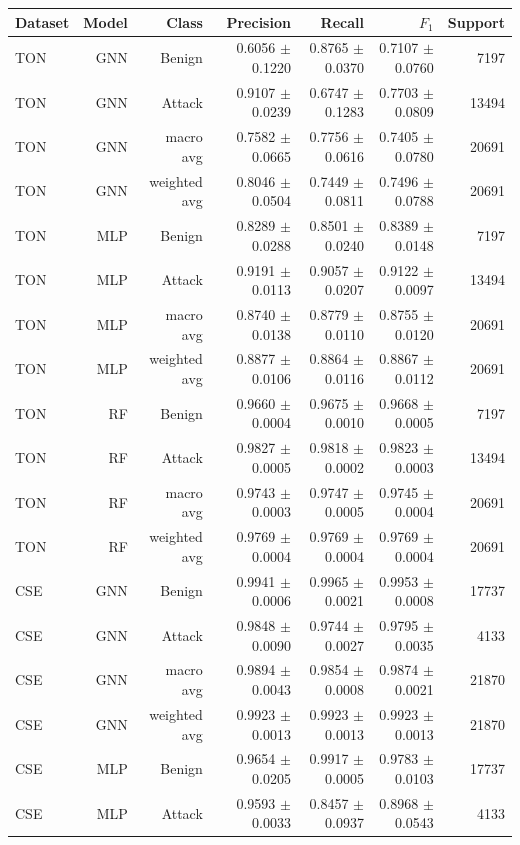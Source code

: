 \begin{tabular}{lrrrrrr}
\toprule
Dataset & Model & Class & Precision & Recall & $F_1$ & Support \\
\midrule
TON & GNN & Benign & 0.6056 $\pm$ 0.1220 & 0.8765 $\pm$ 0.0370 & 0.7107 $\pm$ 0.0760 & 7197 \\
TON & GNN & Attack & 0.9107 $\pm$ 0.0239 & 0.6747 $\pm$ 0.1283 & 0.7703 $\pm$ 0.0809 & 13494 \\
TON & GNN & macro avg & 0.7582 $\pm$ 0.0665 & 0.7756 $\pm$ 0.0616 & 0.7405 $\pm$ 0.0780 & 20691 \\
TON & GNN & weighted avg & 0.8046 $\pm$ 0.0504 & 0.7449 $\pm$ 0.0811 & 0.7496 $\pm$ 0.0788 & 20691 \\
TON & MLP & Benign & 0.8289 $\pm$ 0.0288 & 0.8501 $\pm$ 0.0240 & 0.8389 $\pm$ 0.0148 & 7197 \\
TON & MLP & Attack & 0.9191 $\pm$ 0.0113 & 0.9057 $\pm$ 0.0207 & 0.9122 $\pm$ 0.0097 & 13494 \\
TON & MLP & macro avg & 0.8740 $\pm$ 0.0138 & 0.8779 $\pm$ 0.0110 & 0.8755 $\pm$ 0.0120 & 20691 \\
TON & MLP & weighted avg & 0.8877 $\pm$ 0.0106 & 0.8864 $\pm$ 0.0116 & 0.8867 $\pm$ 0.0112 & 20691 \\
TON & RF & Benign & 0.9660 $\pm$ 0.0004 & 0.9675 $\pm$ 0.0010 & 0.9668 $\pm$ 0.0005 & 7197 \\
TON & RF & Attack & 0.9827 $\pm$ 0.0005 & 0.9818 $\pm$ 0.0002 & 0.9823 $\pm$ 0.0003 & 13494 \\
TON & RF & macro avg & 0.9743 $\pm$ 0.0003 & 0.9747 $\pm$ 0.0005 & 0.9745 $\pm$ 0.0004 & 20691 \\
TON & RF & weighted avg & 0.9769 $\pm$ 0.0004 & 0.9769 $\pm$ 0.0004 & 0.9769 $\pm$ 0.0004 & 20691 \\
CSE & GNN & Benign & 0.9941 $\pm$ 0.0006 & 0.9965 $\pm$ 0.0021 & 0.9953 $\pm$ 0.0008 & 17737 \\
CSE & GNN & Attack & 0.9848 $\pm$ 0.0090 & 0.9744 $\pm$ 0.0027 & 0.9795 $\pm$ 0.0035 & 4133 \\
CSE & GNN & macro avg & 0.9894 $\pm$ 0.0043 & 0.9854 $\pm$ 0.0008 & 0.9874 $\pm$ 0.0021 & 21870 \\
CSE & GNN & weighted avg & 0.9923 $\pm$ 0.0013 & 0.9923 $\pm$ 0.0013 & 0.9923 $\pm$ 0.0013 & 21870 \\
CSE & MLP & Benign & 0.9654 $\pm$ 0.0205 & 0.9917 $\pm$ 0.0005 & 0.9783 $\pm$ 0.0103 & 17737 \\
CSE & MLP & Attack & 0.9593 $\pm$ 0.0033 & 0.8457 $\pm$ 0.0937 & 0.8968 $\pm$ 0.0543 & 4133 \\

\end{tabular}
